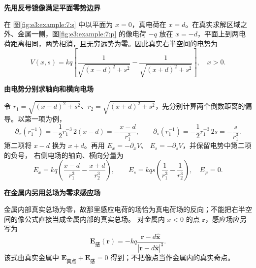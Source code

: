 \begin{solution}\textbf{先用反号镜像满足平面零势边界}\par\nobreak
在 图\ref{fig:e3:example:7:s} 中以平面为 $x=0$，真电荷在 $x=d$。在真实求解区域之外、金属一侧，图\ref{fig:e3:example:7:p} 的像电荷 $-q$ 放在 $x=-d$，平面上到两电荷距离相同，两势相消，且无穷远势为零。因此真实右半空间的电势为
\[
 V(x,s)=kq\left[\frac1{\sqrt{(x-d)^2+s^2}}-\frac1{\sqrt{(x+d)^2+s^2}}\right],\quad x>0.
\]


\par\medskip{}\noindent\textbf{由电势分别求轴向和横向电场}\par\nobreak
令 $r_1=\sqrt{(x-d)^2+s^2}$、$r_2=\sqrt{(x+d)^2+s^2}$，先分别计算两个倒数距离的偏导。以第一项为例，
\[
 \partial_x(r_1^{-1})=-\frac12r_1^{-3}\,2(x-d)
 =-\frac{x-d}{r_1^3},\qquad
 \partial_s(r_1^{-1})=-\frac12r_1^{-3}\,2s=-\frac{s}{r_1^3}.
\]
第二项将 $x-d$ 换为 $x+d$。再用 $E_x=-\partial_xV$、
$E_s=-\partial_sV$，并保留电势中第二项的负号，
右侧电场的轴向、横向分量为
\[
E_x=kq\left(\frac{x-d}{r_1^3}-\frac{x+d}{r_2^3}\right),\qquad
E_s=kqs\left(\frac1{r_1^3}-\frac1{r_2^3}\right),\quad E_\varphi=0.
\]


\par\medskip{}\noindent\textbf{在金属内另用总场为零求感应场}\par\nobreak
金属内部真实总场为零，故那里感应电荷的场恰为真电荷场的反向；不能把右半空间的像公式直接当成金属内部的真实总场。
对金属内 $x<0$ 的点 $\bm r$，感应场应另写为
\[
\bm E_{\text{感}}(\bm r)=-kq\frac{\bm r-d\hat{\bm x}}{|\bm r-d\hat{\bm x}|^3}.
\]
该式由真实金属中 $\bm E_{\text{真点}}+\bm E_{\text{感}}=0$ 得到；不把像点当作金属内的真实奇点。

\end{solution}
